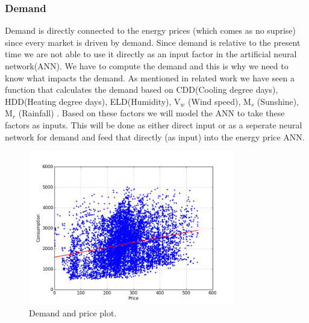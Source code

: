 

\subsubsection{Demand}
Demand is directly connected to the energy prices (which comes as no suprise) since every market is driven by demand. Since demand is relative to the present time we are not able to use it directly as an input factor in the artificial neural network(ANN). We have to compute the demand and this is why we need to know what impacts the demand. As mentioned in related work we have seen a function that calculates the demand based on CDD(Cooling degree days), HDD(Heating degree days), ELD(Humidity), V$_w$ (Wind speed), M$_s$ (Sunshine), M$_r$ (Rainfall) \cite{19}. Based on these factors we will model the ANN to take these factors as inputs. This will be done as either direct input or as a seperate neural network for demand and feed that directly (as input) into the energy price ANN.

\begin{figure}[H]
\centering
\includegraphics[width=0.8\textwidth ,natwidth=410,natheight=237]{billeder/energy_price_plots/consump_price.png}
\caption{Demand and price plot.}
\label{fig:consump_price}
\end{figure}


